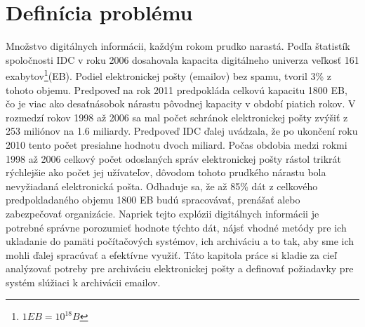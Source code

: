 \documentclass[11pt,twoside,a4paper]{book}
\begin{document}
% 


\chapter{Definícia problému}

Množstvo digitálnych informácii, každým rokom prudko narastá. Podľa štatistík spoločnosti IDC\cite{Gantz_Mcarthur_Minton_2007} v roku 2006 dosahovala kapacita digitálneho univerza veľkosť 161 exabytov\footnote{$1 EB = 10^{18}B$}(EB). Podiel elektronickej pošty (emailov) bez spamu, tvoril 3\% z tohoto objemu. Predpoveď na rok 2011\cite{Gantz_Chute_Manfrediz_Minton_Reinsel_Schlichting_Toncheva_2008} predpokláda celkovú kapacitu 1800 EB, čo je viac ako desaťnásobok nárastu pôvodnej kapacity v období piatich rokov. V rozmedzí rokov 1998 až 2006 sa mal počet schránok elektronickej pošty zvýšiť z 253 miliónov na 1.6 miliardy. Predpoveď IDC ďalej uvádzala, že po ukončení roku 2010 tento počet presiahne hodnotu dvoch miliard. Počas obdobia medzi rokmi 1998 až 2006 celkový počet odoslaných správ elektronickej pošty rástol trikrát rýchlejšie ako počet jej užívateľov, dôvodom tohoto prudkého nárastu bola nevyžiadaná elektronická pošta. Odhaduje sa, že až 85\% dát z celkového predpokladaného objemu 1800 EB budú spracovávať, prenášať alebo zabezpečovať organizácie. Napriek tejto explózii digitálnych informácii je potrebné správne porozumieť hodnote týchto dát, nájsť vhodné metódy pre ich ukladanie do pamäti počítačových systémov, ich archiváciu a to tak, aby sme ich mohli ďalej spracúvať a efektívne využiť. Táto kapitola práce si kladie za cieľ analýzovať potreby pre archiváciu elektronickej pošty a definovať požiadavky pre systém slúžiaci k archivácii emailov.
\end{document}
